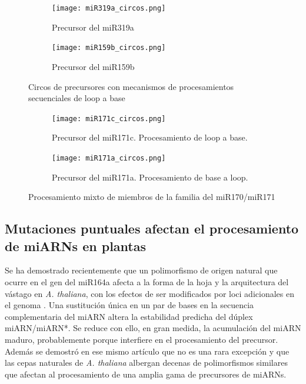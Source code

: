 \begin{landscape}
	\begin{figure}
	\centering
	\begin{subfigure}{.75\textwidth}
 \centering
 \texttt{[image: miR319a\_circos.png]}
 \caption{Precursor del miR319a}
 \label{subfig:miR319a_circos}
	\end{subfigure}%
	\begin{subfigure}{.75\textwidth}
 \centering
 \texttt{[image: miR159b\_circos.png]}
 \caption{Precursor del miR159b}
 \label{subfig:miR159b_circos}
	\end{subfigure}
	\caption{Circos de precursores con mecanismos de procesamientos secuenciales de loop a base}
	\label{fig:seqLTBL_circos}
	\end{figure}
\end{landscape}



\begin{landscape}
	\begin{figure}
	\centering
	\begin{subfigure}{.65\textwidth}
 \centering
 \texttt{[image: miR171c\_circos.png]}
 \caption{Precursor del miR171c. Procesamiento de loop a base. }
 \label{subfig:miR171c_circos}
	\end{subfigure}
	\begin{subfigure}{.65\textwidth}
 \centering
 \texttt{[image: miR171a\_circos.png]}
 \caption{Precursor del miR171a. Procesamiento de base a loop.}
 \label{subfig:miR171a_circos}
	\end{subfigure}
	\caption{Procesamiento mixto de miembros de la familia del miR170/miR171}
	\label{fig:familia_miR171_circos}
	\end{figure}
\end{landscape}


\subsection{Mutaciones puntuales afectan el procesamiento de miARNs en plantas}

Se ha demostrado recientemente que un polimorfismo de origen natural que ocurre en el gen del miR164a afecta a la forma de la hoja y la arquitectura del vástago en \textit{A. thaliana}, con los efectos de ser modificados por loci adicionales en el genoma \citep{pmid22206705}.
Una sustitución única en un par de bases en la secuencia complementaria del miARN altera la estabilidad predicha del dúplex miARN/miARN*.
Se reduce con ello, en gran medida, la acumulación del miARN maduro, probablemente porque interfiere en el procesamiento del precursor.
Además se demostró en ese mismo artículo que no es una rara excepción y que las cepas naturales de \textit{A. thaliana} albergan decenas de polimorfismos similares que afectan al procesamiento de una amplia gama de precursores de miARNs.

